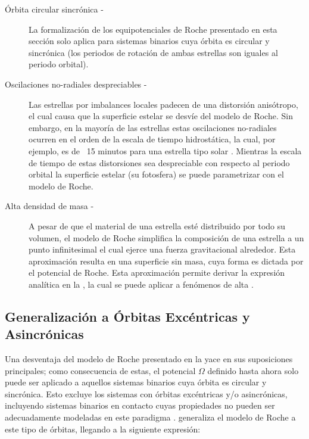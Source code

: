 \begin{description}
	\item[Órbita circular sincrónica -] La formalización de los equipotenciales
	de Roche presentado en esta sección solo aplica para sistemas binarios cuya
	órbita es circular y sincrónica (los periodos de rotación de ambas estrellas
	son iguales al periodo orbital). 
	
	\item[Oscilaciones no-radiales despreciables -]  Las estrellas por
	imbalances locales padecen de una distorsión anisótropo, el cual causa que
	la superficie estelar se desvíe del modelo de Roche. Sin embargo, en la
	mayoría de las estrellas estas oscilaciones no-radiales ocurren en el orden
	de la escala de tiempo hidrostática, la cual, por ejemplo, es de ~15 minutos
	para una estrella tipo solar
	. Mientras
	la escala de tiempo de estas distorsiones sea despreciable con respecto al
	periodo orbital la superficie estelar (su fotosfera) se puede parametrizar
	con el modelo de Roche.

	\item[Alta densidad de masa -] A pesar de que el material de una estrella
	esté distribuido por todo su volumen, el modelo de Roche simplifica la
	composición de una estrella a un punto infinitesimal el cual ejerce una
	fuerza gravitacional alrededor. Esta aproximación resulta en una superficie
	sin masa, cuya forma es dictada por el potencial de Roche. Esta aproximación
	permite derivar la expresión analítica en la , la
	cual se puede aplicar a fenómenos de alta 
	.
\end{description}

\subsection{Generalización a Órbitas Excéntricas y Asincrónicas}

Una desventaja del modelo de Roche presentado en la 
yace en sus suposiciones principales; como consecuencia de estas, el potencial
$\Omega$ definido hasta ahora solo puede ser aplicado a aquellos sistemas
binarios cuya órbita es circular y sincrónica. Esto excluye los sistemas con
órbitas excéntricas y/o asincrónicas, incluyendo sistemas binarios en contacto
cuyas propiedades no pueden ser adecuadamente modeladas en este paradigma
.
\autocite{wilson_eccentric_1979} generaliza el modelo de Roche a este tipo de
órbitas, llegando a la siguiente expresión:


